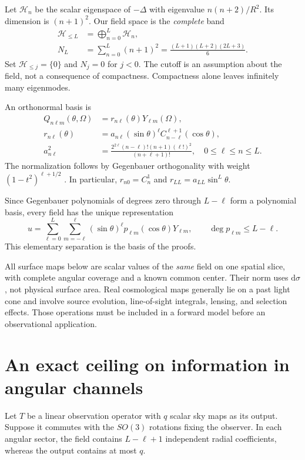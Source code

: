 \documentclass[aps,prd,reprint,amsmath,amssymb,nofootinbib,
longbibliography]{revtex4-2}
\newcommand{\HH}{\mathcal H}
\newcommand{\dd}{\mathrm d}
\begin{document}
Let $\HH_n$ be the scalar eigenspace of $-\Delta$ with eigenvalue
$n(n+2)/R^2$. Its dimension is $(n+1)^2$. Our field space is the
\emph{complete} band
\begin{align}
 \HH_{\leq L}&=\bigoplus_{n=0}^L\HH_n,\\
 N_L&=\sum_{n=0}^L(n+1)^2
 =\frac{(L+1)(L+2)(2L+3)}6 .
 \label{eq:dimension}
\end{align}
Set $\HH_{\leq j}=\{0\}$ and $N_j=0$ for $j<0$.
The cutoff is an assumption about the field, not a consequence of
compactness. Compactness alone leaves infinitely many eigenmodes.

An orthonormal basis is
\begin{align}
 Q_{n\ell m}(\theta,\Omega)&=r_{n\ell}(\theta)Y_{\ell m}(\Omega),\\
 r_{n\ell}(\theta)&=a_{n\ell}(\sin\theta)^\ell
 C_{n-\ell}^{\ell+1}(\cos\theta),\\
 a_{n\ell}^2&=
 \frac{2^{2\ell}(n-\ell)!(n+1)(\ell!)^2}{(n+\ell+1)!},
 \quad 0\leq\ell\leq n\leq L.
 \label{eq:radial}
\end{align}
The normalization follows by Gegenbauer orthogonality with weight
$(1-t^2)^{\ell+1/2}$ \cite{DLMFPoly}. In particular,
$r_{n0}=C_n^1$ and $r_{LL}=a_{LL}\sin^L\theta$.

Since Gegenbauer polynomials of degrees zero through $L-\ell$ form a
polynomial basis, every field has the unique representation
\begin{equation}
 u=\sum_{\ell=0}^L\sum_{m=-\ell}^{\ell}
 (\sin\theta)^\ell p_{\ell m}(\cos\theta)Y_{\ell m},
 \qquad \deg p_{\ell m}\leq L-\ell .
 \label{eq:poly}
\end{equation}
This elementary separation is the basis of the proofs.

All surface maps below are scalar values of the \emph{same} field on one
spatial slice, with complete angular coverage and a known common center.
Their norm uses $\dd\sigma$, not physical surface area. Real cosmological
maps generally lie on a past light cone and involve source evolution,
line-of-sight integrals, lensing, and selection effects. Those operations
must be included in a forward model before an observational application.

\section{An exact ceiling on information in angular channels}
\label{sec:rank}

Let $T$ be a linear observation operator with $q$ scalar sky maps as its
output. Suppose it commutes with the $SO(3)$ rotations fixing the observer.
In each angular sector, the field contains $L-\ell+1$ independent radial
coefficients, whereas the output contains at most $q$.
\end{document}
